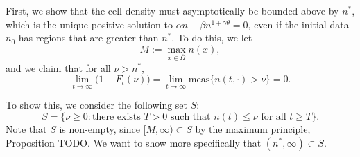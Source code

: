 \documentclass[12pt]{article}
\theoremstyle{plain}
\begin{document}
First, we show that the cell density must asymptotically be bounded above by $n^{*}$, which is the unique positive solution to $\alpha n - \beta n^{1 + \gamma \theta} = 0$, even if the initial data $n_{0}$ has regions that are greater than $n^{*}$. To do this, we let
\begin{equation*}
M := \max_{x \in \overline{\Omega}} n(x),
\end{equation*}
and we claim that for all $\nu > n^{*}$, 
\begin{equation*}
\lim_{t \to \infty} \Big(1 - F_{t}(\nu)\Big) = \lim_{t \to \infty} \text{meas}\{n(t, \cdot) > \nu\} = 0.
\end{equation*}

To show this, we consider the following set $S$:
\begin{equation*}
S = \{\nu \ge 0 : \text{there exists $T > 0$ such that $n(t) \le \nu$ for all $t \ge T$}\}.
\end{equation*}
Note that $S$ is non-empty, since $[M, \infty) \subset S$ by the maximum principle, Proposition TODO. We want to show more specifically that $(n^{*}, \infty) \subset S$.
\end{document}
